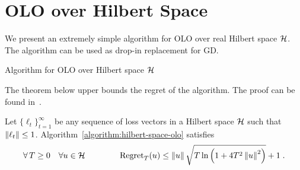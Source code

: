 \section{\acl{OLO} over Hilbert Space}

We present an extremely simple algorithm for \ac{OLO}
over real Hilbert space $\mathcal{H}$. The algorithm can be used as drop-in replacement for
\ac{GD}.

\begin{algorithm}[h]
\caption{Algorithm for OLO over Hilbert space $\mathcal{H}$
\label{algorithm:hilbert-space-olo}}
\begin{algorithmic}
{
\ENDFOR
}
\end{algorithmic}
\end{algorithm}

The theorem below upper bounds the regret of the algorithm.
The proof can be found in~\cite{Orabona-Pal-2016-parameter-free}.

\begin{theorem}
\label{theorem:hilbert-space-olo-regret}
Let $\{\ell_t\}_{t=1}^\infty$ be any sequence of loss vectors
in a Hilbert space $\mathcal{H}$ such that $\left\|{\ell_t}\right\| \le 1$.
Algorithm~\ref{algorithm:hilbert-space-olo} satisfies
$$
\forall \, T \ge 0 \quad
\forall u \in \mathcal{H} \qquad \qquad
\operatorname{Regret}_T(u) \le \left\|{u}\right\| \sqrt{T \ln\left(1 + 4T^2 \left\|{u}\right\|^2 \right)} + 1 \;.
$$
\end{theorem}
